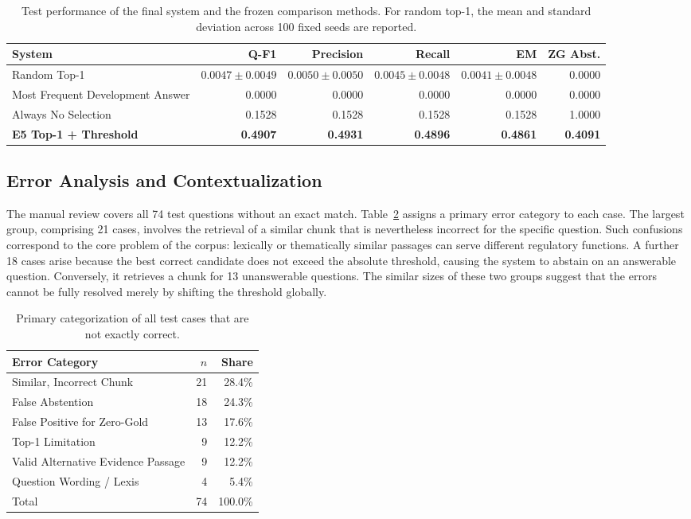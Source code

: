 \documentclass[11pt]{article}
\begin{document}
\begin{table}[t]
\centering
\small
\begin{tabular}{lrrrrr}
\toprule
\textbf{System} & \textbf{Q-F1} & \textbf{Precision} & \textbf{Recall} & \textbf{EM} & \textbf{ZG Abst.} \\
\midrule
Random Top-1 & $0.0047\pm0.0049$ & $0.0050\pm0.0050$ & $0.0045\pm0.0048$ & $0.0041\pm0.0048$ & 0.0000 \\
Most Frequent Development Answer & 0.0000 & 0.0000 & 0.0000 & 0.0000 & 0.0000 \\
Always No Selection & 0.1528 & 0.1528 & 0.1528 & 0.1528 & 1.0000 \\
\textbf{E5 Top-1 + Threshold} & \textbf{0.4907} & \textbf{0.4931} & \textbf{0.4896} & \textbf{0.4861} & \textbf{0.4091} \\
\bottomrule
\end{tabular}
\caption{Test performance of the final system and the frozen comparison methods. For random top-1, the mean and standard deviation across 100 fixed seeds are reported.}
\label{tab:baselines}
\end{table}

\subsection{Error Analysis and Contextualization}

The manual review covers all 74 test questions without an exact match. Table~\ref{tab:error-analysis} assigns a primary error category to each case. The largest group, comprising 21 cases, involves the retrieval of a similar chunk that is nevertheless incorrect for the specific question. Such confusions correspond to the core problem of the corpus: lexically or thematically similar passages can serve different regulatory functions. A further 18 cases arise because the best correct candidate does not exceed the absolute threshold, causing the system to abstain on an answerable question. Conversely, it retrieves a chunk for 13 unanswerable questions. The similar sizes of these two groups suggest that the errors cannot be fully resolved merely by shifting the threshold globally.

\begin{table}[t]
\centering
\small
\begin{tabular}{lrr}
\toprule
\textbf{Error Category} & \textbf{$n$} & \textbf{Share} \\
\midrule
Similar, Incorrect Chunk & 21 & 28.4\% \\
False Abstention & 18 & 24.3\% \\
False Positive for Zero-Gold & 13 & 17.6\% \\
Top-1 Limitation & 9 & 12.2\% \\
Valid Alternative Evidence Passage & 9 & 12.2\% \\
Question Wording / Lexis & 4 & 5.4\% \\
\midrule
Total & 74 & 100.0\% \\
\bottomrule
\end{tabular}
\caption{Primary categorization of all test cases that are not exactly correct.}
\label{tab:error-analysis}
\end{table}
\end{document}
